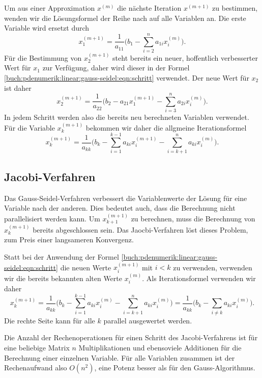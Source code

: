 Um aus einer Approximation $x^{(m)}$ die nächste Iteration $x^{(m+1)}$
zu bestimmen, wenden wir die Lösungsformel der Reihe nach auf alle
Variablen an.
Die erste Variable wird ersetzt durch
\[
x_1^{(m+1)}
=
\frac{1}{a_{11}}
\biggl(
b_1
-
\sum_{i=2}^n a_{1i}x_i^{(m)}
\biggr).
\]
Für die Bestimmung von $x_2^{(m+1)}$ steht bereits ein neuer,
hoffentlich verbesserter Wert für $x_1$ zur Verfügung, daher wird
dieser in der Formel \eqref{buch:pdenumerik:linear:gauss-seidel:eqn:schritt}
verwendet.
Der neue Wert für $x_2$ ist daher
\begin{equation}
x_2^{(m+1)}
=
\frac{1}{a_{22}}
\biggl(
b_2 - a_{21}x_1^{(m+1)}
-
\sum_{i=3}^n a_{2i}x_i^{(m)}
\biggr).
\end{equation}
In jedem Schritt werden also die bereits neu berechneten Variablen
verwendet.
Für die Variable $x_k^{(m+1)}$ bekommen wir daher die allgmeine
Iterationsformel
\begin{equation}
x_k^{(m+1)}
=
\frac{1}{a_{kk}}
\biggl(
b_k - \sum_{i=1}^{k-1} a_{ki}x_i^{(m+1)} - \sum_{i=k+1}^n a_{ki}x_i^{(m)}
\biggr).
\label{buch:pdenumerik:linear:gauss-seidel:iteration}
\end{equation}

%
%
\subsection{Jacobi-Verfahren
\label{buch:pdenumerik:linear:subsection:jacobi}}
Das Gauss-Seidel-Verfahren verbessert die Variablenwerte der Lösung
für eine Variable nach der anderen.
Dies bedeutet auch, dass die Berechnung nicht parallelisiert werden
kann.
Um $x_{k+1}^{(m+1)}$ zu berechnen, muss die Berechnung von $x_k^{(m+1)}$
bereits abgeschlossen sein.
Das Jaocbi-Verfahren löst dieses Problem, zum Preis einer langsameren
Konvergenz.

Statt bei der Anwendung der Formel
\eqref{buch:pdenumerik:linear:gauss-seidel:eqn:schritt}
die neuen Werte $x_i^{(m+1)}$ mit $i<k$ zu verwenden, verwenden wir
die bereits bekannten alten Werte $x_i^{(m)}$.
Als Iterationsformel verwenden wir daher
\begin{equation}
x_k^{(m+1)}
=
\frac{1}{a_{kk}}
\biggl(
b_k
-
\sum_{i=1}^{k-1} a_{ki} x_i^{(m)}
-
\sum_{i=k+1}^n a_{ki} x_i^{(m)}
\biggr)
=
\frac{1}{a_{kk}}
\biggl(
b_k
-
\sum_{i\ne k} a_{ki} x_i^{(m)}
\biggr).
\end{equation}
Die rechte Seite kann für alle $k$ parallel ausgewertet werden.

Die Anzahl der Rechenoperationen für einen Schritt des Jacobi-Verfahrens
ist für eine beliebige Matrix $n$ Multiplikationen und ebensoviele
Additionen für die Berechnung einer einzelnen Variable.
Für alle Variablen zusammen ist der Rechenaufwand also $O(n^2)$,
eine Potenz besser als für den Gauss-Algorithmus.

